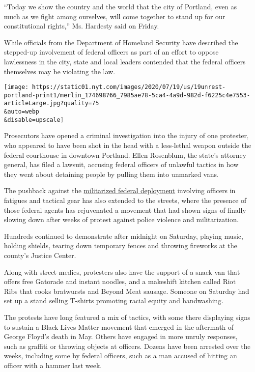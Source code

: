 ``Today we show the country and the world that the city of Portland,
even as much as we fight among ourselves, will come together to stand up
for our constitutional rights,'' Ms. Hardesty said on Friday.

While officials from the Department of Homeland Security have described
the stepped-up involvement of federal officers as part of an effort to
oppose lawlessness in the city, state and local leaders contended that
the federal officers themselves may be violating the law.

\texttt{[image: https://static01.nyt.com/images/2020/07/19/us/19unrest-portland-print1/merlin\_174698766\_7985ae78-5ca4-4a9d-982d-f6225c4e7553-articleLarge.jpg?quality=75\\\&auto=webp\\\&disable=upscale]}

Prosecutors have opened a criminal investigation into the injury of one
protester, who appeared to have been shot in the head with a less-lethal
weapon outside the federal courthouse in downtown Portland. Ellen
Rosenblum, the state's attorney general, has filed a lawsuit, accusing
federal officers of unlawful tactics in how they went about detaining
people by pulling them into unmarked vans.

The pushback against the
\href{https://www.nytimes.com/2020/07/17/us/portland-protests.html}{militarized
federal deployment} involving officers in fatigues and tactical gear has
also extended to the streets, where the presence of those federal agents
has rejuvenated a movement that had shown signs of finally slowing down
after weeks of protest against police violence and militarization.

Hundreds continued to demonstrate after midnight on Saturday, playing
music, holding shields, tearing down temporary fences and throwing
fireworks at the county's Justice Center.

Along with street medics, protesters also have the support of a snack
van that offers free Gatorade and instant noodles, and a makeshift
kitchen called Riot Ribs that cooks bratwursts and Beyond Meat sausage.
Someone on Saturday had set up a stand selling T-shirts promoting racial
equity and handwashing.

The protests have long featured a mix of tactics, with some there
displaying signs to sustain a Black Lives Matter movement that emerged
in the aftermath of George Floyd's death in May. Others have engaged in
more unruly responses, such as graffiti or throwing objects at officers.
Dozens have been arrested over the weeks, including some by federal
officers, such as a man accused of hitting an officer with a hammer last
week.

